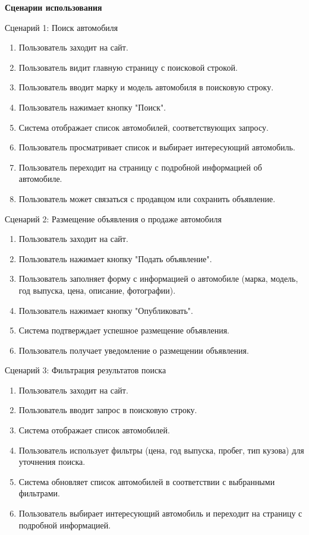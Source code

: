 \textbf{Сценарии использования}

Сценарий 1: Поиск автомобиля

\begin{enumerate}
    \item Пользователь заходит на сайт.
    \item Пользователь видит главную страницу с поисковой строкой.
    \item Пользователь вводит марку и модель автомобиля в поисковую строку.
    \item Пользователь нажимает кнопку "Поиск".
    \item Система отображает список автомобилей, соответствующих запросу.
    \item Пользователь просматривает список и выбирает интересующий автомобиль.
    \item Пользователь переходит на страницу с подробной информацией об автомобиле.
    \item Пользователь может связаться с продавцом или сохранить объявление.
\end{enumerate}
\bigskip

Сценарий 2: Размещение объявления о продаже автомобиля

\begin{enumerate}
    \item Пользователь заходит на сайт.
    \item Пользователь нажимает кнопку "Подать объявление".
    \item Пользователь заполняет форму с информацией о автомобиле (марка, модель, год выпуска, цена, описание, фотографии).
    \item Пользователь нажимает кнопку "Опубликовать".
    \item Система подтверждает успешное размещение объявления.
    \item Пользователь получает уведомление о размещении объявления.
\end{enumerate}
\bigskip

Сценарий 3: Фильтрация результатов поиска

\begin{enumerate}
    \item Пользователь заходит на сайт.
    \item Пользователь вводит запрос в поисковую строку.
    \item Система отображает список автомобилей.
    \item Пользователь использует фильтры (цена, год выпуска, пробег, тип кузова) для уточнения поиска.
    \item Система обновляет список автомобилей в соответствии с выбранными фильтрами.
    \item Пользователь выбирает интересующий автомобиль и переходит на страницу с подробной информацией.
\end{enumerate}
\bigskip

